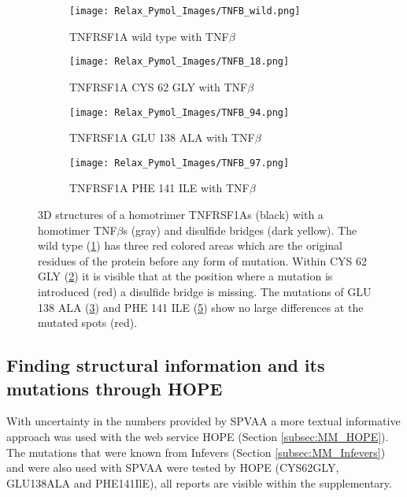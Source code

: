 		\begin{figure}[!ht]
		\centering
		\begin{subfigure}{0.49\textwidth}
			\texttt{[image: Relax\_Pymol\_Images/TNFB\_wild.png]}
			\caption{TNFRSF1A wild type with TNF$\beta$}
			\label{fig:RES_TNFB_wild}
		\end{subfigure}
		\begin{subfigure}{0.49\textwidth}
			\texttt{[image: Relax\_Pymol\_Images/TNFB\_18.png]}
			\caption{TNFRSF1A CYS 62 GLY with TNF$\beta$}
			\label{fig:RES_TNFB_18}
		\end{subfigure}
		\par\bigskip
		\begin{subfigure}{0.49\textwidth}
			\texttt{[image: Relax\_Pymol\_Images/TNFB\_94.png]}
			\caption{TNFRSF1A GLU 138 ALA with TNF$\beta$}
			\label{fig:RES_TNFB_94}
		\end{subfigure}
		\begin{subfigure}{0.49\textwidth}
			\texttt{[image: Relax\_Pymol\_Images/TNFB\_97.png]}
			\caption{TNFRSF1A PHE 141 ILE with TNF$\beta$}
			\label{fig:RES_TNFB_97}
		\end{subfigure}
	\caption[TNFRSF1A homo trimer with TNF$\beta$ homo trimers wild type and mutated relaxed models]{3D structures of a homotrimer TNFRSF1As (black) with a homotimer TNF$\beta$s (gray) and disulfide bridges (dark yellow). The wild type (\ref{fig:RES_TNFB_wild}) has three red colored areas which are the original residues of the protein before any form of mutation. Within CYS 62 GLY (\ref{fig:RES_TNFB_18}) it is visible that at the position where a mutation is introduced (red) a disulfide bridge is missing. The mutations of GLU 138 ALA (\ref{fig:RES_TNFB_94}) and PHE 141 ILE (\ref{fig:RES_TNFB_97}) show no large differences at the mutated spots (red).}
	\end{figure}
	
\newpage
	
\newpage	
\subsection{Finding structural information and its mutations through HOPE}
	With uncertainty in the numbers provided by SPVAA a more textual informative approach was used with the web service HOPE (Section \ref{subsec:MM_HOPE}). The mutations that were known from Infevers (Section \ref{subsec:MM_Infevers}) and were also used with SPVAA were tested by HOPE (CYS62GLY, GLU138ALA and PHE141IlE), all reports are visible within the supplementary.
	
